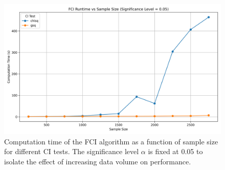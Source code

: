 \begin{figure}[htbp]
    \centering
    \includegraphics[width=1\textwidth]{Report/final_report/pictures/fci_runtime_vs_samplesize.png}
    \caption{Computation time of the FCI algorithm as a function of sample size for different CI tests. The significance level $\alpha$ is fixed at 0.05 to isolate the effect of increasing data volume on performance.}
    \label{fig:fci_runtime_vs_samplesize}
\end{figure}
